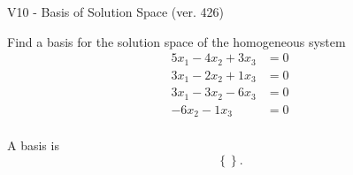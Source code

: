 \begin{exercise}
  \begin{exerciseTitle}V10 - Basis of Solution Space (ver. 426)\end{exerciseTitle}
  \begin{exerciseStatement}
    Find a basis for the solution space of the homogeneous system 
\begin{align*}
 5 x_ 1 -4 x_ 2 + 3 x_ 3 &= 0  \\ 
  3 x_ 1 -2 x_ 2 + 1 x_ 3 &= 0  \\ 
  3 x_ 1 -3 x_ 2 -6 x_ 3 &= 0  \\ 
  -6 x_ 2 -1 x_ 3 &= 0  \\ 
 \end{align*}


 
  \end{exerciseStatement}

  \begin{exerciseAnswer}
   A basis is   
\[\left\{\right\}.\]

  


  \end{exerciseAnswer}
\end{exercise}